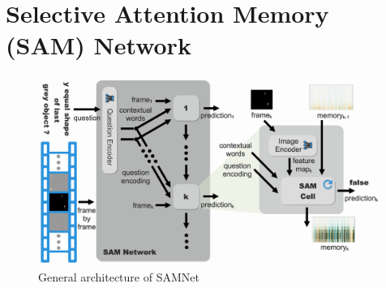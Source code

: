 \section{Selective Attention Memory (SAM) Network}



\begin{figure}[hbtp]
	\centering
	\includegraphics[width=\textwidth]{../img/architecture/samnet_architecture4}
	\caption{General architecture of SAMNet}
	\label{fig:samnet}
\end{figure}	

